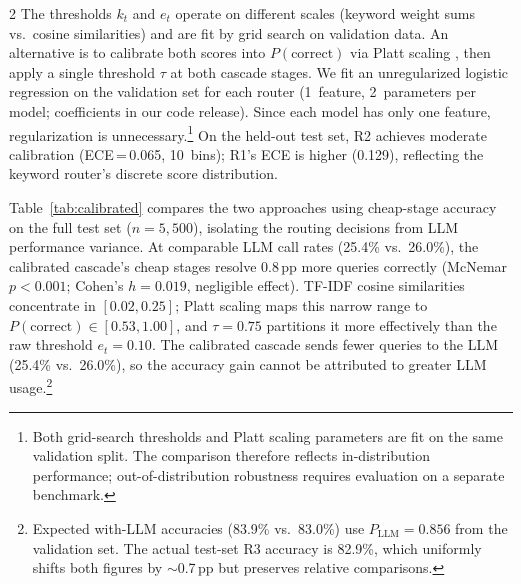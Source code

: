 \documentclass[11pt,a4paper]{article}
\begin{document}
\begin{multicols}{2}
The thresholds $k_t$ and $e_t$ operate on different scales (keyword weight sums vs.\ cosine similarities) and are fit by grid search on validation data. An alternative is to calibrate both scores into $P(\text{correct})$ via Platt scaling \citep{platt1999probabilistic}, then apply a single threshold $\tau$ at both cascade stages. We fit an unregularized logistic regression on the validation set for each router (1~feature, 2~parameters per model; coefficients in our code release). Since each model has only one feature, regularization is unnecessary.\footnote{Both grid-search thresholds and Platt scaling parameters are fit on the same validation split. The comparison therefore reflects in-distribution performance; out-of-distribution robustness requires evaluation on a separate benchmark.} On the held-out test set, R2 achieves moderate calibration (ECE\,=\,0.065, 10~bins); R1's ECE is higher (0.129), reflecting the keyword router's discrete score distribution.

Table~\ref{tab:calibrated} compares the two approaches using cheap-stage accuracy on the full test set ($n = 5{,}500$), isolating the routing decisions from LLM performance variance. At comparable LLM call rates (25.4\% vs.\ 26.0\%), the calibrated cascade's cheap stages resolve 0.8\,pp more queries correctly (McNemar $p < 0.001$; Cohen's $h = 0.019$, negligible effect). TF-IDF cosine similarities concentrate in $[0.02, 0.25]$; Platt scaling maps this narrow range to $P(\text{correct}) \in [0.53, 1.00]$, and $\tau = 0.75$ partitions it more effectively than the raw threshold $e_t = 0.10$. The calibrated cascade sends fewer queries to the LLM (25.4\% vs.\ 26.0\%), so the accuracy gain cannot be attributed to greater LLM usage.\footnote{Expected with-LLM accuracies (83.9\% vs.\ 83.0\%) use $P_{\text{LLM}} = 0.856$ from the validation set. The actual test-set R3 accuracy is 82.9\%, which uniformly shifts both figures by ${\sim}$0.7\,pp but preserves relative comparisons.}

\begin{center}
\small
{}
\label{tab:calibrated}
\end{center}


\end{multicols}
\end{document}
